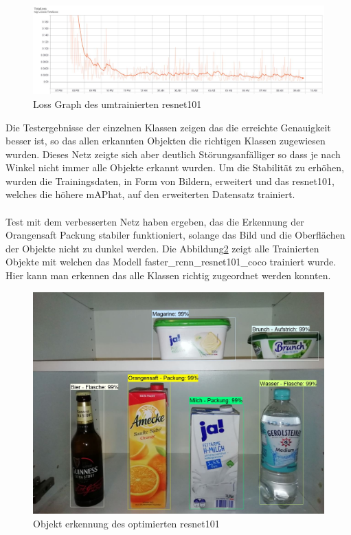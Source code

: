 \documentclass[a4paper,12pt,oneside]{article}
\begin{document}
\begin{figure}
    [h]
	\centering
	\includegraphics[scale=0.4]{Sources/loss_graph_resnet101.jpg}
	\vspace{0.5 cm}
	\caption{Loss Graph des umtrainierten resnet101}
	\label{img:loss_graph_resnet101}
\end{figure}

Die Testergebnisse der einzelnen Klassen zeigen das die erreichte Genauigkeit besser ist, so das allen erkannten Objekten die richtigen Klassen zugewiesen wurden. Dieses Netz zeigte sich aber deutlich Störungsanfälliger so dass je nach Winkel nicht immer alle Objekte erkannt wurden. Um die Stabilität zu erhöhen, wurden die Trainingsdaten, in Form von Bildern, erweitert und das resnet101, welches die höhere \glqq mAP\grqq hat, auf den erweiterten Datensatz trainiert.\\
\\
Test mit dem verbesserten Netz haben ergeben, das die Erkennung der Orangensaft Packung stabiler funktioniert, solange das Bild und die Oberflächen der Objekte nicht zu dunkel werden. Die Abbildung\ref{img:resnet101_test} zeigt alle Trainierten Objekte mit welchen das Modell faster\_rcnn\_resnet101\_coco trainiert wurde. Hier kann man erkennen das alle Klassen richtig zugeordnet werden konnten.

\begin{figure}
    [h]
	\centering
	\includegraphics[scale=0.5]{Sources/final_detection.jpg}
	\vspace{0.3 cm}
	\caption{Objekt erkennung des optimierten resnet101}
	\label{img:resnet101_test}
\end{figure}
\end{document}
